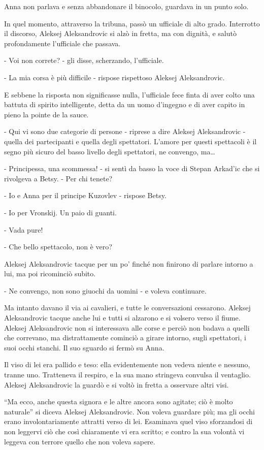 Anna non parlava e senza abbandonare il binocolo, guardava in un punto solo. 

In quel momento, attraverso la tribuna, passò un ufficiale di alto grado. Interrotto il discorso, Aleksej Aleksandrovic si alzò in fretta, ma con dignità, e salutò profondamente l'ufficiale che passava. 

- Voi non correte? - gli disse, scherzando, l'ufficiale. 

- La mia corsa è più difficile - rispose rispettoso Aleksej Aleksandrovic. 

E sebbene la risposta non significasse nulla, l'ufficiale fece finta di aver colto una battuta di spirito intelligente, detta da un uomo d'ingegno e di aver capito in pieno la pointe de la sauce. 

- Qui vi sono due categorie di persone - riprese a dire Aleksej Aleksandrovic - quella dei partecipanti e quella degli spettatori. L'amore per questi spettacoli è il segno più sicuro del basso livello degli spettatori, ne convengo, ma\ldots{} 

- Principessa, una scommessa! - si sentì da basso la voce di Stepan Arkad'ic che si rivolgeva a Betsy. - Per chi tenete? 

- Io e Anna per il principe Kuzovlev - rispose Betsy. 

- Io per Vronskij. Un paio di guanti. 

- Vada pure! 

- Che bello spettacolo, non è vero? 

Aleksej Aleksandrovic tacque per un po' finché non finirono di parlare intorno a lui, ma poi ricominciò subito. 

- Ne convengo, non sono giuochi da uomini - e voleva continuare. 

Ma intanto davano il via ai cavalieri, e tutte le conversazioni cessarono. Aleksej Aleksandrovic tacque anche lui e tutti si alzarono e si volsero verso il fiume. Aleksej Aleksandrovic non si interessava alle corse e perciò non badava a quelli che correvano, ma distrattamente cominciò a girare intorno, sugli spettatori, i suoi occhi stanchi. Il suo sguardo si fermò su Anna. 

Il viso di lei era pallido e teso: ella evidentemente non vedeva niente e nessuno, tranne uno. Tratteneva il respiro, e la sua mano stringeva convulsa il ventaglio. Aleksej Aleksandrovic la guardò e si voltò in fretta a osservare altri visi. 

``Ma ecco, anche questa signora e le altre ancora sono agitate; ciò è molto naturale'' si diceva Aleksej Aleksandrovic. Non voleva guardare più; ma gli occhi erano involontariamente attratti verso di lei. Esaminava quel viso sforzandosi di non leggervi ciò che così chiaramente vi era scritto; e contro la sua volontà vi leggeva con terrore quello che non voleva sapere. 

